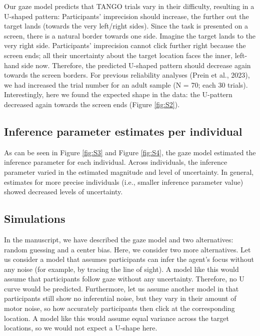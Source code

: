 \documentclass[
  man,mask,floatsintext]{apa7}
\begin{document}
Our gaze model predicts that TANGO trials vary in their difficulty, resulting in a U-shaped pattern: Participants' imprecision should increase, the further out the target lands (towards the very left/right sides). Since the task is presented on a screen, there is a natural border towards one side. Imagine the target lands to the very right side. Participants' imprecision cannot click further right because the screen ends; all their uncertainty about the target location faces the inner, left-hand side now. Therefore, the predicted U-shaped pattern should decrease again towards the screen borders. For previous reliability analyses (Prein et al., 2023), we had increased the trial number for an adult sample (N = 70; each 30 trials). Interestingly, here we found the expected shape in the data: the U-pattern decreased again towards the screen ends (Figure \ref{fig:S2}).

\hypertarget{inference-parameter-estimates-per-individual}{%
\subsection{Inference parameter estimates per individual}\label{inference-parameter-estimates-per-individual}}

As can be seen in Figure \ref{fig:S3} and Figure \ref{fig:S4}, the gaze model estimated the inference parameter for each individual. Across individuals, the inference parameter varied in the estimated magnitude and level of uncertainty. In general, estimates for more precise individuals (i.e., smaller inference parameter value) showed decreased levels of uncertainty.

\newpage

\hypertarget{simulations}{%
\subsection{Simulations}\label{simulations}}

In the manuscript, we have described the gaze model and two alternatives: random guessing and a center bias. Here, we consider two more alternatives. Let us consider a model that assumes participants can infer the agent's focus without any noise (for example, by tracing the line of sight). A model like this would assume that participants follow gaze without any uncertainty. Therefore, no U curve would be predicted.
Furthermore, let us assume another model in that participants still show no inferential noise, but they vary in their amount of motor noise, so how accurately participants then click at the corresponding location. A model like this would assume equal variance across the target locations, so we would not expect a U-shape here.
\end{document}
